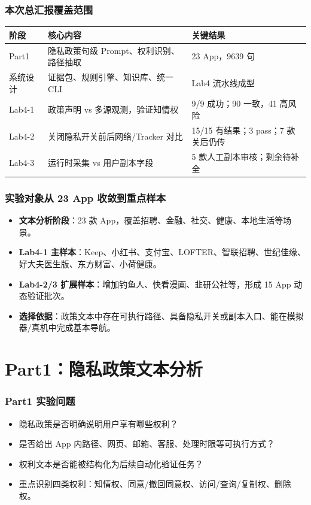 \documentclass[AutoFakeBold,AutoFakeSlant]{beamer}
\begin{document}
\begin{frame}
    \frametitle{本次总汇报覆盖范围}
    \small
    \begin{tabularx}{\textwidth}{|l|X|l|}
        \hline
        \textbf{阶段} & \textbf{核心内容} & \textbf{关键结果} \\
        \hline
        Part1 & 隐私政策句级 Prompt、权利识别、路径抽取 & 23 App，9639 句 \\
        \hline
        系统设计 & 证据包、规则引擎、知识库、统一 CLI & Lab4 流水线成型 \\
        \hline
        Lab4-1 & 政策声明 vs 多源观测，验证知情权 & 9/9 成功；90 一致，41 高风险 \\
        \hline
        Lab4-2 & 关闭隐私开关前后网络/Tracker 对比 & 15/15 有结果；3 pass；7 款关后仍传 \\
        \hline
        Lab4-3 & 运行时采集 vs 用户副本字段 & 5 款人工副本审核；剩余待补全 \\
        \hline
    \end{tabularx}
\end{frame}

\begin{frame}
    \frametitle{实验对象从 23 App 收敛到重点样本}
    \small
    \begin{itemize}
        \item \textbf{文本分析阶段}：23 款 App，覆盖招聘、金融、社交、健康、本地生活等场景。
        \item \textbf{Lab4-1 主样本}：Keep、小红书、支付宝、LOFTER、智联招聘、世纪佳缘、好大夫医生版、东方财富、小荷健康。
        \item \textbf{Lab4-2/3 扩展样本}：增加钓鱼人、快看漫画、韭研公社等，形成 15 App 动态验证批次。
        \item \textbf{选择依据}：政策文本中存在可执行路径、具备隐私开关或副本入口、能在模拟器/真机中完成基本导航。
    \end{itemize}
\end{frame}

\section{Part1：隐私政策文本分析}

\begin{frame}
    \frametitle{Part1 实验问题}
    \small
    \begin{itemize}
        \item 隐私政策是否明确说明用户享有哪些权利？
        \item 是否给出 App 内路径、网页、邮箱、客服、处理时限等可执行方式？
        \item 权利文本是否能被结构化为后续自动化验证任务？
        \item 重点识别四类权利：知情权、同意/撤回同意权、访问/查询/复制权、删除权。
    \end{itemize}
\end{frame}
\end{document}

